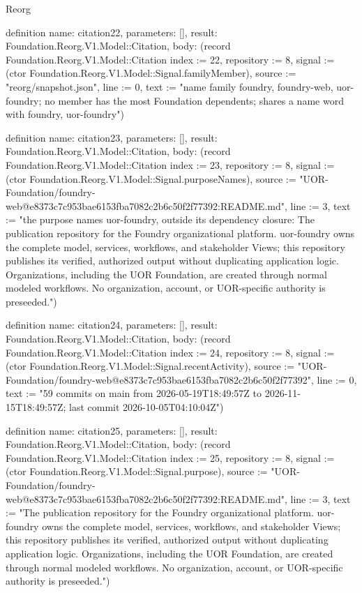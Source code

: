 \begin{lexlean}{Reorg}
\begin{semanticmodule}
definition{
  name: citation22,
  parameters: [],
  result: Foundation.Reorg.V1.Model::Citation,
  body: (record Foundation.Reorg.V1.Model::Citation {index := 22, repository := 8, signal := (ctor Foundation.Reorg.V1.Model::Signal.familyMember), source := "reorg/snapshot.json", line := 0, text := "name family {foundry, foundry-web, uor-foundry}; no member has the most Foundation dependents; shares a name word with foundry, uor-foundry"})
}

definition{
  name: citation23,
  parameters: [],
  result: Foundation.Reorg.V1.Model::Citation,
  body: (record Foundation.Reorg.V1.Model::Citation {index := 23, repository := 8, signal := (ctor Foundation.Reorg.V1.Model::Signal.purposeNames), source := "UOR-Foundation/foundry-web@e8373c7c953bae6153fba7082c2b6c50f2f77392:README.md", line := 3, text := "the purpose names uor-foundry, outside its dependency closure: The publication repository for the Foundry organizational platform. uor-foundry owns the complete model, services, workflows, and stakeholder Views; this repository publishes its verified, authorized output without duplicating application logic. Organizations, including the UOR Foundation, are created through normal modeled workflows. No organization, account, or UOR-specific authority is preseeded."})
}

definition{
  name: citation24,
  parameters: [],
  result: Foundation.Reorg.V1.Model::Citation,
  body: (record Foundation.Reorg.V1.Model::Citation {index := 24, repository := 8, signal := (ctor Foundation.Reorg.V1.Model::Signal.recentActivity), source := "UOR-Foundation/foundry-web@e8373c7c953bae6153fba7082c2b6c50f2f77392", line := 0, text := "59 commits on main from 2026-05-19T18:49:57Z to 2026-11-15T18:49:57Z; last commit 2026-10-05T04:10:04Z"})
}

definition{
  name: citation25,
  parameters: [],
  result: Foundation.Reorg.V1.Model::Citation,
  body: (record Foundation.Reorg.V1.Model::Citation {index := 25, repository := 8, signal := (ctor Foundation.Reorg.V1.Model::Signal.purpose), source := "UOR-Foundation/foundry-web@e8373c7c953bae6153fba7082c2b6c50f2f77392:README.md", line := 3, text := "The publication repository for the Foundry organizational platform. uor-foundry owns the complete model, services, workflows, and stakeholder Views; this repository publishes its verified, authorized output without duplicating application logic. Organizations, including the UOR Foundation, are created through normal modeled workflows. No organization, account, or UOR-specific authority is preseeded."})
}


\end{semanticmodule}
\end{lexlean}
